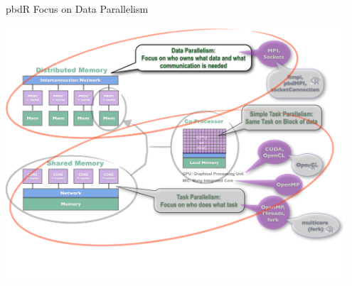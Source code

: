 \begin{frame}
\begin{block}{pbdR Focus on Data Parallelism}
    
\includegraphics[width=0.95\textwidth]{../common/pics/ParallelHardware11.pdf}
\end{block}
\end{frame}
